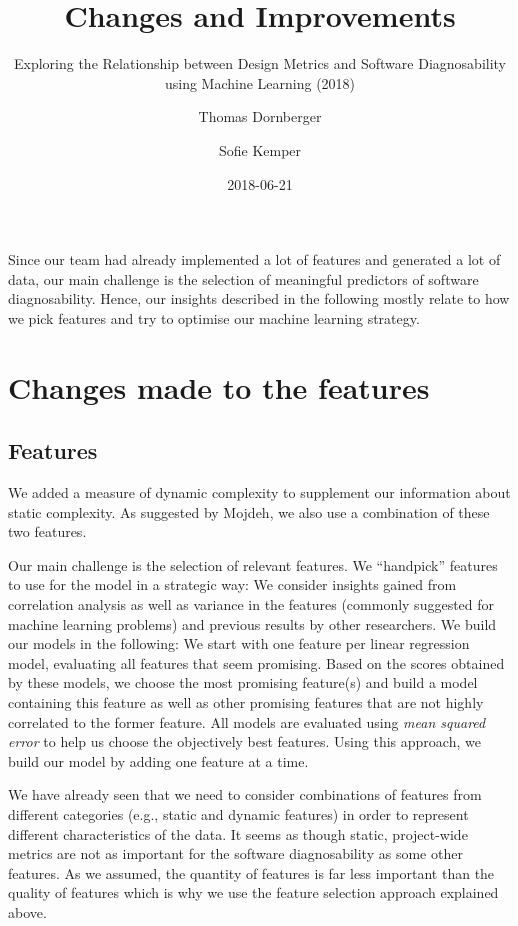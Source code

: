 \documentclass{scrartcl}
\begin{document}
\title{Changes and Improvements}
\subtitle{Exploring the Relationship between Design Metrics and Software
Diagnosability using Machine Learning (2018)}
\author{Thomas Dornberger \and Sofie Kemper}
\date{2018-06-21}

\maketitle

Since our team had already implemented a lot of features and generated a lot of
data, our main challenge is the selection of meaningful predictors of software
diagnosability. Hence, our insights described in the following mostly relate to
how we pick features and try to optimise our machine learning strategy.

\section{Changes made to the features}

\subsection{Features}

We added a measure of dynamic complexity to supplement our information about
static complexity. As suggested by Mojdeh, we also use a combination of these
two features.

Our main challenge is the selection of relevant features. We \enquote{handpick}
features to use for the model in a strategic way: We consider insights gained
from correlation analysis as well as variance in the features (commonly
suggested for machine learning problems) and previous results by other
researchers. We build our models in the following: We start with one feature per
linear regression model, evaluating all features that seem promising. Based on
the scores obtained by these models, we choose the most promising feature(s) and
build a model containing this feature as well as other promising features that
are not highly correlated to the former feature. All models are evaluated using
\emph{mean squared error} to help us choose the objectively best features. Using
this approach, we build our model by adding one feature at a time.

We have already seen that we need to consider combinations of features from
different categories (e.g., static and dynamic features) in order to represent
different characteristics of the data. It seems as though static, project-wide
metrics are not as important for the software diagnosability as some other
features. As we assumed, the quantity of features is far less important than the
quality of features which is why we use the feature selection approach explained
above.
\end{document}
